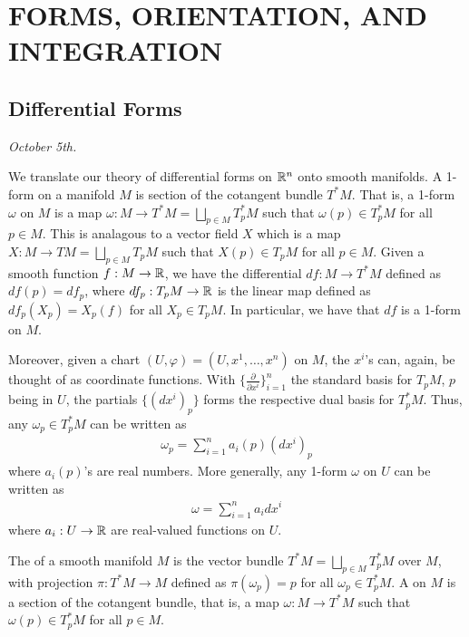 \chapter{FORMS, ORIENTATION, AND INTEGRATION}

\section{Differential Forms}
\textit{October 5th.}

We translate our theory of differential forms on $\mathbb{R}^{n}$ onto smooth manifolds. A 1-form on a manifold $M$ is section of the cotangent bundle $T^{\ast}M$. That is, a 1-form $\omega$ on $M$ is a map $\omega:M \to T^{\ast}M = \bigsqcup_{p \in M} T^{\ast}_{p}M$ such that $\omega(p) \in T^{\ast}_{p}M$ for all $p \in M$. This is analagous to a vector field $X$ which is a map $X:M \to TM = \bigsqcup_{p \in M} T_{p}M$ such that $X(p) \in T_{p}M$ for all $p \in M$. Given a smooth function $f:M \to \mathbb{R}$, we have the differential $df:M \to T^{\ast}M$ defined as $df(p) = df_{p}$, where $df_{p}:T_{p}M \to \mathbb{R}$ is the linear map defined as $df_{p}(X_{p}) = X_{p}(f)$ for all $X_{p} \in T_{p}M$. In particular, we have that $df$ is a 1-form on $M$.

Moreover, given a chart $(U,\varphi) = (U,x^{1},\ldots,x^{n})$ on $M$, the $x^{i}$'s can, again, be thought of as coordinate functions. With $\{\frac{\partial}{\partial x^{i}}\}_{i=1}^{n}$ the standard basis for $T_{p}M$, $p$ being in $U$, the partials $\{(dx^{i})_{p}\}$ forms the respective dual basis for $T_{p}^{\ast}M$. Thus, any $\omega_{p} \in T_{p}^{\ast}M$ can be written as
\begin{align}
    \omega_{p} = \sum_{i=1}^{n} a_{i}(p)(dx^{i})_{p}
\end{align}
where $a_{i}(p)$'s are real numbers. More generally, any 1-form $\omega$ on $U$ can be written as
\begin{align}
    \omega = \sum_{i=1}^{n} a_{i} dx^{i}
\end{align}
where $a_{i}:U \to \mathbb{R}$ are real-valued functions on $U$.

\begin{definition}
    The  of a smooth manifold $M$ is the vector bundle $T^{\ast}M = \bigsqcup_{p \in M} T^{\ast}_{p}M$ over $M$, with projection $\pi:T^{\ast}M \to M$ defined as $\pi(\omega_{p}) = p$ for all $\omega_{p} \in T^{\ast}_{p}M$. A  on $M$ is a section of the cotangent bundle, that is, a map $\omega:M \to T^{\ast}M$ such that $\omega(p) \in T^{\ast}_{p}M$ for all $p \in M$.
\end{definition}

